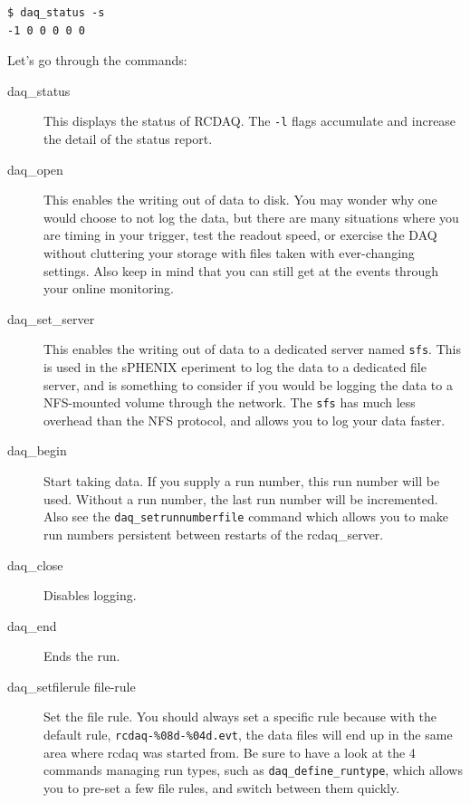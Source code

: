 \documentclass{article}[11pt]
\begin{document}
\begin{verbatim}
$ daq_status -s
-1 0 0 0 0 0 
\end{verbatim}

Let's go through the commands:

\begin{description}


\item[daq\_status] This displays the status of RCDAQ.
  The \verb|-l| flags accumulate and increase the detail of the status
  report.

\item[daq\_open] This enables the writing out of data to disk. You may
  wonder why one would choose to not log the data, but there are many
  situations where you are timing in your trigger, test the readout
  speed, or exercise the DAQ without cluttering your storage with
  files taken with ever-changing settings. Also keep in mind that you
  can still get at the events through your online monitoring.
 
\item[daq\_set\_server] This enables the writing out of data to a
  dedicated server named \verb|sfs|. This is used in the sPHENIX
  eperiment to log the data to a dedicated file server, and is
  something to consider if you would be logging the data to a
  NFS-mounted volume through the network. The \verb|sfs| has much less
  overhead than the NFS protocol, and allows you to log your data
  faster.
 
\item[daq\_begin] Start taking data. If you supply a run number,
  this run number will be used.  Without a run number, the last run
  number will be incremented. Also see the \verb|daq_setrunnumberfile|
  command which allows you to make run numbers persistent between
  restarts of the rcdaq\_server.

\item[daq\_close] Disables logging.

\item[daq\_end] Ends the run.

\item[daq\_setfilerule file-rule] Set the file rule. You should always
  set a specific rule because with the default rule,
  \verb|rcdaq-%08d-%04d.evt|, the data files will end up in the same
  area where rcdaq was started from.  Be sure to have a look at the 4 commands
  managing run types, such as \verb|daq_define_runtype|, which allows
  you to pre-set a few file rules, and switch between them quickly.


\end{description}
\end{document}
